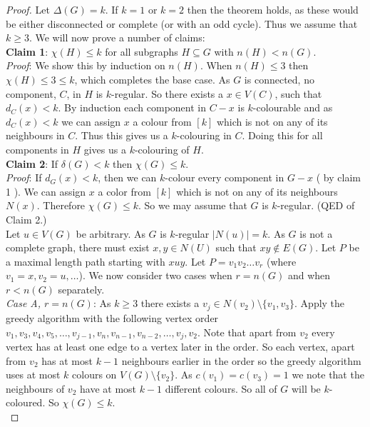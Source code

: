 \begin{proof}
	Let \(\Delta(G) = k\). If $k = 1$ or $k = 2$ then the theorem holds, as these would be either disconnected or complete (or with an odd cycle). Thus we assume that $k \ge 3$. We will now prove a number of claims:\\
	\noindent
	\textbf{Claim 1}: $\chi(H) \le k$ for all subgraphs $H \subseteq G$ with $n(H) < n(G)$.\\
	\noindent
	\textit{Proof}: We show this by induction on $n(H)$. When $n(H) \le 3$ then $\chi(H) \le 3 \le k$, which completes the base case. As $G$ is connected, no component, $C$, in $H$ is $k$-regular. So there exists a $x \in  V(C)$, such that $d_{C}(x) < k$. By induction each component in $C-x$ is $k$-colourable and as $d_{C}(x) < k$ we can assign $x$ a colour from $[k]$ which is not on any of its neighbours in $C$. Thus this gives us a $k$-colouring in $C$. Doing this for all components in $H$ gives us a $k$-colouring of $H$.\\
	\noindent
	\textbf{Claim 2}: If \(\delta(G) < k\) then $\chi(G) \le k$.\\
	\noindent
	\textit{Proof}: If $d_{G}(x) < k$, then we can $k$-colour every component in $G-x$ ( by claim 1 ). We can assign $x$ a color from $[k]$ which is not on any of its neighbours $N(x)$. Therefore $\chi(G) \le k$. So we may assume that $G$ is $k$-regular. (QED of Claim 2.)\\
	\noindent
	Let $u \in V(G)$ be arbitrary. As $G$ is $k$-regular $|N(u)|= k$. As $G$ is not a complete graph, there must exist $x,y \in N(U)$ such that $xy \notin E(G)$. Let $P$ be a maximal length path starting with $xuy$. Let $P = v_{1}v_{2} \ldots v_{r}$ (where $v_{1} = x, v_{2} = u, \ldots$). We now consider two cases when $r = n(G)$ and when $r < n(G)$ separately.\\
	\noindent
	\textit{Case A, $r = n(G)$}: As $k \ge 3$ there exists a $v_{j} \in N(v_{2}) \setminus \{v_{1}, v_{3}\}$. Apply the greedy algorithm with the following vertex order $v_{1}, v_{3}, v_{4}, v_{5}, \ldots, v_{j-1}, v_{n}, v_{n-1}, v_{n-2}, \ldots, v_{j}, v_{2}$. Note that apart from $v_{2}$ every vertex has at least one edge to a vertex later in the order. So each vertex, apart from $v_{2}$ has at most $k-1$ neighbours earlier in the order so the greedy algorithm uses at most $k$ colours on $V(G) \setminus \{v_{2}\}$. As $c(v_{1}) = c(v_{3}) = 1$ we note that the neighbours of $v_{2}$ have at most $k-1$ different colours. So all of $G$ will be $k$-coloured.  So $\chi(G) \le k$.\\

\end{proof}
